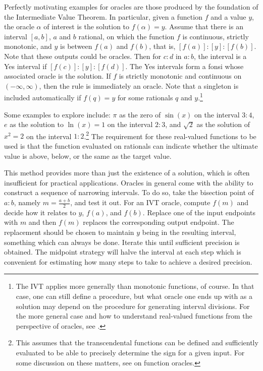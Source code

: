\documentclass[12pt]{article}
\begin{document}
Perfectly motivating examples for oracles are those produced by the foundation of the Intermediate Value Theorem. In particular, given a function $f$ and a value $y$, the oracle $\alpha$ of interest is the solution to $f(\alpha) = y$. Assume that there is an interval $[a,b]$, $a$ and $b$ rational,  on which the function $f$ is continuous, strictly monotonic, and $y$ is between $f(a)$ and $f(b)$, that is, $[f(a)] : [y] : [f(b)]$. Note that these outputs could be oracles. Then for $c:d$ in $a:b$, the interval is a Yes interval if $[f(c)]: [y] : [f(d)]$. The Yes intervals form a fonsi whose associated oracle is the solution.  If $f$ is strictly monotonic and continuous on $(-\infty, \infty)$, then the rule is immediately an oracle. Note that a singleton is included automatically if $f(q) =y $ for some rationals $q$ and $y$.\footnote{The IVT applies more generally than monotonic functions, of course. In that case, one can still define a procedure, but what oracle one ends up with as a solution may depend on the procedure for generating interval divisions. For the more general case and how to understand real-valued functions from the perspective of oracles, see \cite{taylor23funora}.} 

Some examples to explore include: $\pi$ as the zero of $\sin(x)$ on the interval $3:4$, $e$ as the solution to  $\ln(x)=1$ on the interval $2:3$, and $\sqrt{2}$ as the solution of $x^2 = 2$ on the interval $1:2$.\footnote{This assumes that the transcendental functions can be defined and sufficiently evaluated to be able to precisely determine the sign for a given input. For some discussion on these matters, see \cite{taylor23funora} on function oracles.} The requirement for these real-valued functions to be used is that the function evaluated on rationals can indicate whether the ultimate value is above, below, or the same as the target value. 

This method provides more than just the existence of a solution, which is often insufficient for practical applications. Oracles in general come with the ability to construct a sequence of narrowing intervals. To do so, take the bisection point of $a:b$, namely $m =\frac{a+b}{2}$, and test it out. For an IVT oracle, compute $f(m)$ and decide how it relates to $y$, $f(a)$, and $f(b)$. Replace one of the input endpoints with $m$ and then $f(m)$ replaces the corresponding output endpoint. The replacement should be chosen to maintain $y$ being in the resulting interval, something which can always be done. Iterate this until sufficient precision is obtained.  The midpoint strategy will halve the interval at each step which is convenient for estimating how many steps to take to achieve a desired precision. 
\end{document}
